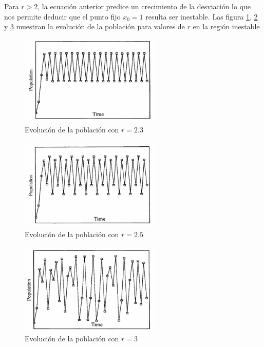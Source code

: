 Para $r>2$, la ecuación anterior predice un crecimiento de la desviación lo que nos permite deducir que el punto fijo $x_0=1$ resulta ser inestable. Las figura \ref{fig:r2_3}, \ref{fig:r2_5} y \ref{fig:r3} muestran la evolución de la población para valores de $r$ en la región inestable

\begin{figure}[hbtp]
\centering
\includegraphics[width = 0.6\textwidth]{img/r2_3.png}
\caption{Evolución de la población con $r=2.3$}
\label{fig:r2_3}
\end{figure}
\begin{figure}[hbtp]
\centering
\includegraphics[width = 0.6\textwidth]{img/r2_5.png}
\caption{Evolución de la población con $r=2.5$}
\label{fig:r2_5}
\end{figure}
\begin{figure}[hbtp]
\centering
\includegraphics[width = 0.6\textwidth]{img/r3.png}
\caption{Evolución de la población con $r=3$}
\label{fig:r3}
\end{figure}

